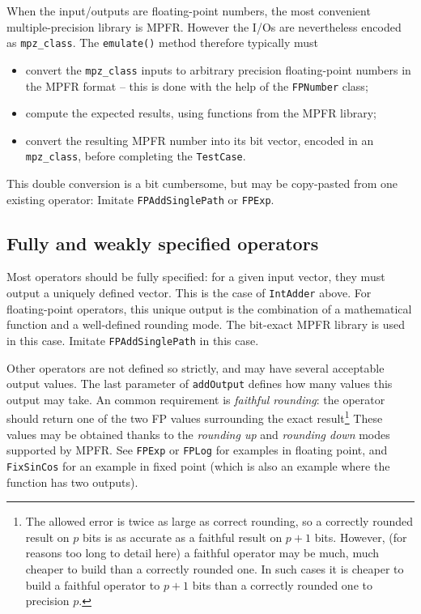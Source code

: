 \documentclass{article}
\begin{document}
When the input/outputs are floating-point numbers, the most convenient multiple-precision library is MPFR.
However the I/Os  are nevertheless encoded as \texttt{\small mpz\_class}.
The \texttt{\small emulate()} method therefore typically must
\begin{itemize}
\item convert the \texttt{\small mpz\_class} inputs to arbitrary precision floating-point numbers in the MPFR format -- this is done with the help of the \texttt{\small FPNumber} class;
\item compute the expected results, using functions from the MPFR library;
\item convert the resulting MPFR number into its bit vector, encoded in an \texttt{\small mpz\_class}, before completing the \texttt{\small TestCase}. 
\end{itemize}
This double conversion is a bit cumbersome, but may be copy-pasted from one existing operator: Imitate \texttt{\small FPAddSinglePath} or \texttt{\small FPExp}.


\subsection{Fully and weakly specified operators}
 Most operators should be fully specified: for a given input
  vector, they must output a uniquely defined vector. This is the case of 
  \texttt{\small IntAdder} above. For floating-point
  operators, this unique output is the combination of a mathematical
  function and a well-defined rounding mode. The bit-exact MPFR
  library is used in this case. Imitate \texttt{\small FPAddSinglePath} in this case.

 Other operators are not defined so strictly, and may have  several acceptable output values.
 The last parameter of \texttt{\small addOutput} defines how many values this output may take.
 An common requirement is \emph{faithful rounding}: the operator should return one of the two FP values surrounding the exact result\footnote{
 The allowed error is twice as large as correct rounding, so a correctly rounded result on $p$ bits is as accurate as a faithful result on $p+1$ bits. 
 However, (for reasons too long to detail here) a faithful operator may be much, much cheaper to build than a correctly rounded one.
 In such cases it is cheaper to build a faithful operator to $p+1$ bits than a correctly rounded one to precision $p$.}
These values may be obtained thanks to the  \emph{rounding up} and \emph{rounding down} modes supported by MPFR.
See \texttt{\small FPExp} or \texttt{\small FPLog} for  examples in floating point, and \texttt{FixSinCos} for an example in fixed point (which is also an example where the function has two outputs).
\end{document}
